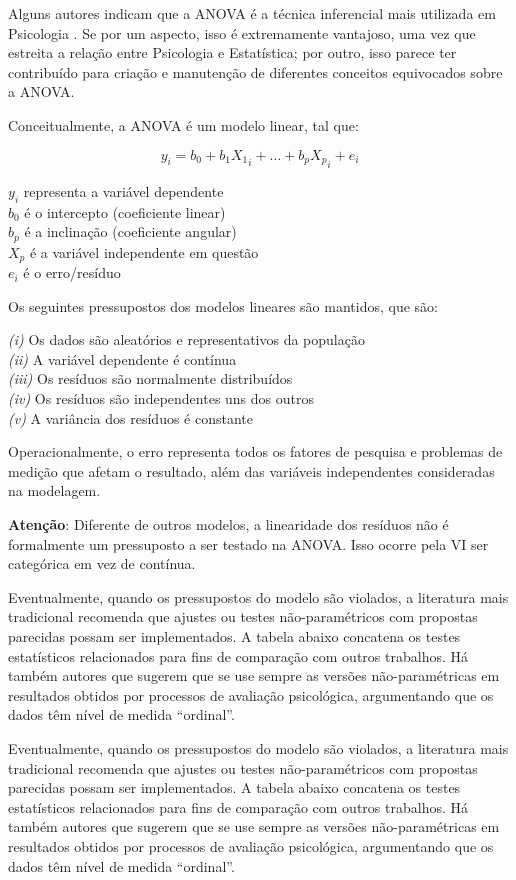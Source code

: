 \documentclass[
]{book}
\begin{document}
Alguns autores indicam que a ANOVA é a técnica inferencial mais utilizada em Psicologia \citep{Chartier2008}. Se por um aspecto, isso é extremamente vantajoso, uma vez que estreita a relação entre Psicologia e Estatística; por outro, isso parece ter contribuído para criação e manutenção de diferentes conceitos equivocados sobre a ANOVA.

Conceitualmente, a ANOVA é um modelo linear, tal que:

\[y_i = b_0 + b_1X{_1}_i + \dots + b_pX{_p}_i + e_i\]

\(y_i\) representa a variável dependente\\
\(b_0\) é o intercepto (coeficiente linear)\\
\(b_p\) é a inclinação (coeficiente angular)\\
\(X_p\) é a variável independente em questão\\
\(e_i\) é o erro/resíduo

Os seguintes pressupostos dos modelos lineares são mantidos, que são:

\emph{(i)} Os dados são aleatórios e representativos da população\\
\emph{(ii)} A variável dependente é contínua\\
\emph{(iii)} Os resíduos são normalmente distribuídos\\
\emph{(iv)} Os resíduos são independentes uns dos outros\\
\emph{(v)} A variância dos resíduos é constante

Operacionalmente, o erro representa todos os fatores de pesquisa e problemas de medição que afetam o resultado, além das variáveis independentes consideradas na modelagem.

\textbf{Atenção}: Diferente de outros modelos, a linearidade dos resíduos não é formalmente um pressuposto a ser testado na ANOVA. Isso ocorre pela VI ser categórica em vez de contínua.

Eventualmente, quando os pressupostos do modelo são violados, a literatura mais tradicional recomenda que ajustes ou testes não-paramétricos com propostas parecidas possam ser implementados. A tabela abaixo concatena os testes estatísticos relacionados para fins de comparação com outros trabalhos. Há também autores que sugerem que se use sempre as versões não-paramétricas em resultados obtidos por processos de avaliação psicológica, argumentando que os dados têm nível de medida ``ordinal''.

Eventualmente, quando os pressupostos do modelo são violados, a literatura mais tradicional recomenda que ajustes ou testes não-paramétricos com propostas parecidas possam ser implementados. A tabela abaixo concatena os testes estatísticos relacionados para fins de comparação com outros trabalhos. Há também autores que sugerem que se use sempre as versões não-paramétricas em resultados obtidos por processos de avaliação psicológica, argumentando que os dados têm nível de medida ``ordinal''.
\end{document}
